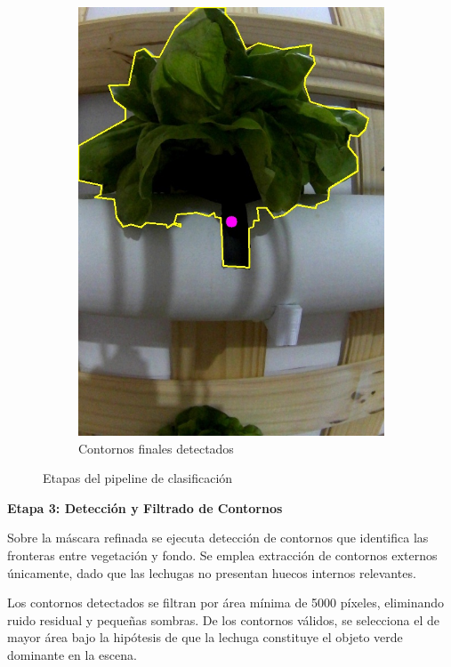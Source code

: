 \begin{figure}[H]
\begin{subfigure}[b]{0.48\textwidth}
    \includegraphics[width=\textwidth]{imagenes/clasificador_6_contornos.jpg}
    \caption{Contornos finales detectados}
\end{subfigure}

\caption{Etapas del pipeline de clasificación}
\label{fig:clasificador_etapa2}
\end{figure}

\textbf{Etapa 3: Detección y Filtrado de Contornos}

Sobre la máscara refinada se ejecuta detección de contornos que identifica las fronteras entre vegetación y fondo. Se emplea extracción de contornos externos únicamente, dado que las lechugas no presentan huecos internos relevantes.

Los contornos detectados se filtran por área mínima de 5000 píxeles, eliminando ruido residual y pequeñas sombras. De los contornos válidos, se selecciona el de mayor área bajo la hipótesis de que la lechuga constituye el objeto verde dominante en la escena.

